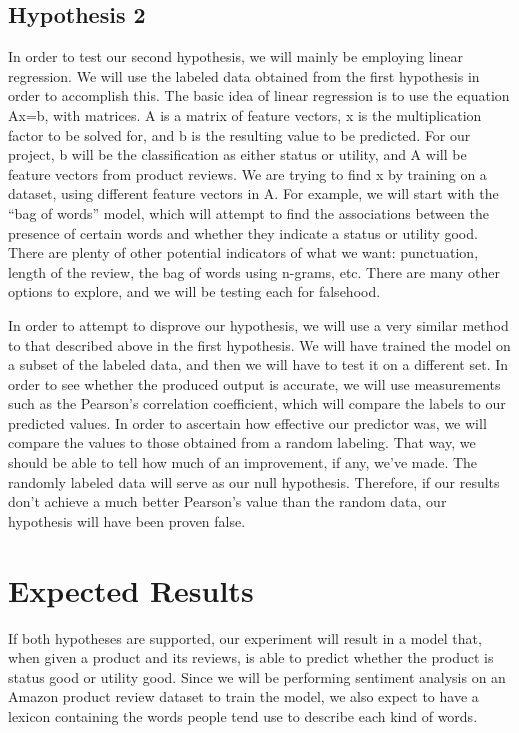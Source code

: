 \documentclass[dvips,12pt]{article}
\begin{document}
\subsection{Hypothesis 2}
In order to test our second hypothesis, we will mainly be employing linear regression. We will use the labeled data obtained from the first hypothesis in order to accomplish this. The basic idea of linear regression is to use the equation Ax=b, with matrices. A is a matrix of feature vectors, x is the multiplication factor to be solved for, and b is the resulting value to be predicted. For our project, b will be the classification as either status or utility, and A will be feature vectors from product reviews. We are trying to find x by training on a dataset, using different feature vectors in A. For example, we will start with the “bag of words” model, which will attempt to find the associations between the presence of certain words and whether they indicate a status or utility good. There are plenty of other potential indicators of what we want: punctuation, length of the review, the bag of words using n-grams, etc. There are many other options to explore, and we will be testing each for falsehood. \newline


In order to attempt to disprove our hypothesis, we will use a very similar method to that described above in the first hypothesis. We will have trained the model on a subset of the labeled data, and then we will have to test it on a different set. In order to see whether the produced output is accurate, we will use measurements such as the Pearson’s correlation coefficient, which will compare the labels to our predicted values. In order to ascertain how effective our predictor was, we will compare the values to those obtained from a random labeling. That way, we should be able to tell how much of an improvement, if any, we’ve made. The randomly labeled data will serve as our null hypothesis. Therefore, if our results don’t achieve a much better Pearson’s value than the random data, our hypothesis will have been proven false.



\section{Expected Results}
If both hypotheses are supported, our experiment will result in a model that, when given a product and its reviews, is able to predict whether the product is status good or utility good. Since we will be performing sentiment analysis on an Amazon product review dataset to train the model, we also expect to have a lexicon containing the words people tend use to describe each kind of words. 





{}

\end{document}
